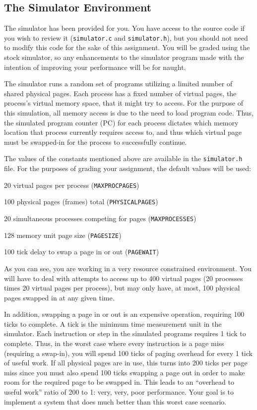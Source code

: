 \documentclass[12pt]{article}
\newenvironment{packed_item}{
\begin{itemize}
  \setlength{\itemsep}{1pt}
  \setlength{\parskip}{0pt}
  \setlength{\parsep}{0pt}
}{\end{itemize}}
\begin{document}
\subsection {The Simulator Environment}

The simulator has been provided for you. You have access to the source
code if you wish to review it (\texttt{simulator.c} and
\texttt{simulator.h}), but you
should not need to modify this code for the sake of this
assignment. You will be graded using the stock simulator, so any
enhancements to the simulator program made with the intention of
improving your performance will be for naught.

The simulator runs a random set of programs utilizing a limited
number of shared physical pages. Each process has a fixed number of
virtual pages, the process's virtual memory space,
that it might try to access. For the purpose of this
simulation, all memory access is due to the need to load program
code. Thus, the simulated program counter (PC) for each process
dictates which memory location that process currently requires access
to, and thus which virtual page must be swapped-in for the
process to successfully continue.

The values of the constants mentioned above
are available in the \texttt{simulator.h} file. For the purposes of
grading your assignment, the default values will be used:

\begin{packed_item}
\item 20 virtual pages per process (\texttt{MAXPROCPAGES})
\item 100 physical pages (frames) total (\texttt{PHYSICALPAGES})
\item 20 simultaneous processes competing for pages (\texttt{MAXPROCESSES})
\item 128 memory unit page size (\texttt{PAGESIZE})
\item 100 tick delay to swap a page in or out (\texttt{PAGEWAIT})
\end{packed_item}

As you can see, you are working in a very resource constrained
environment. You will have to deal with attempts to access up to 400
virtual pages (20 processes times 20 virtual pages per process),
but may only have, at most, 100 physical pages swapped in at any given
time.

In addition, swapping a page
in or out is an expensive operation, requiring 100 ticks to
complete. A tick is the minimum time measurement unit in the
simulator. Each instruction or step in the simulated programs requires 1
tick to complete. Thus, in the worst case where every instruction is a
page miss (requiring a swap-in), you will spend 100 ticks of paging
overhead for every 1 tick of useful work. If all physical pages are in
use, this turns into 200 ticks per page miss since you must also
spend 100 ticks swapping a page out in order to make room for the
required page to be swapped in. This leads to an ``overhead to
useful work'' ratio of 200 to 1: very, very, poor performance. Your
goal is to implement a system that does much better than this worst case
scenario.
\end{document}
